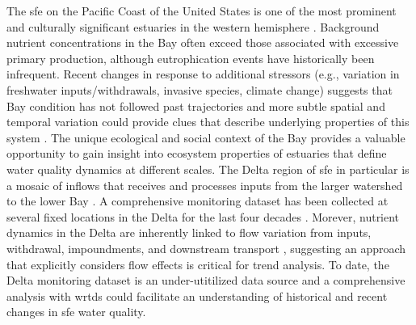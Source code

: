 \documentclass[journal = esthag, manuscript = article]{achemso}\usepackage[]{graphicx}\usepackage[]{color}
\begin{document}
The \ac{sfe} on the Pacific Coast of the United States is one of the most prominent and culturally significant estuaries in the western hemisphere \cite{Cloern15}.  Background nutrient concentrations in the Bay often exceed those associated with excessive primary production, although eutrophication events have historically been infrequent.  Recent changes in response to additional stressors (e.g., variation in freshwater inputs/withdrawals, invasive species, climate change) suggests that Bay condition has not followed past trajectories and more subtle spatial and temporal variation could provide clues that describe underlying properties of this system \cite{Cloern12b}.  The unique ecological and social context of the Bay provides a valuable opportunity to gain insight into ecosystem properties of estuaries that define water quality dynamics at different scales. The Delta region of \ac{sfe} in particular is a mosaic of inflows that receives and processes inputs from the larger watershed to the lower Bay \cite{Jassby00,Jassby02,Jassby08}. A comprehensive monitoring dataset has been collected at several fixed locations in the Delta for the last four decades \cite{Jabusch16}.  Morever, nutrient dynamics in the Delta are inherently linked to flow variation from inputs, withdrawal, impoundments, and downstream transport \cite{Novick15}, suggesting an approach that explicitly considers flow effects is critical for trend analysis.  To date, the Delta monitoring dataset is an under-utitilized data source and a comprehensive analysis with \ac{wrtds} could facilitate an understanding of historical and recent changes in \ac{sfe} water quality.
\end{document}
